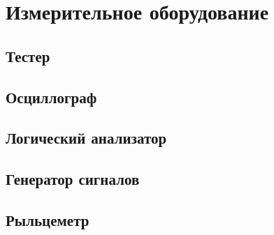 \section{Измерительное оборудование}

\subsection{Тестер}

\subsection{Осциллограф}

\subsection{Логический анализатор}

\subsection{Генератор сигналов}

\subsection{Рыльцеметр}

